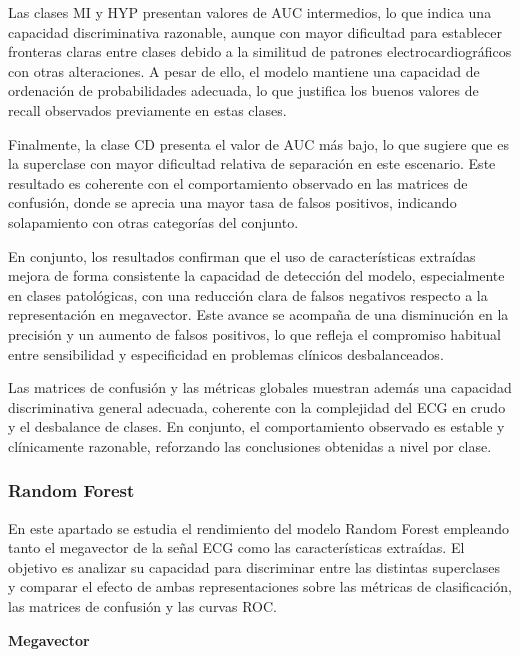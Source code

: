 \documentclass[12pt,a4paper,twoside]{book}
\begin{document}
Las clases MI y HYP presentan valores de AUC intermedios, lo que indica una capacidad discriminativa razonable, aunque con mayor dificultad para establecer fronteras claras entre clases debido a la similitud de patrones electrocardiográficos con otras alteraciones. 
A pesar de ello, el modelo mantiene una capacidad de ordenación de probabilidades adecuada, lo que justifica los buenos valores de recall observados previamente en estas clases.

Finalmente, la clase CD presenta el valor de AUC más bajo, lo que sugiere que es la superclase con mayor dificultad relativa de separación en este escenario. 
Este resultado es coherente con el comportamiento observado en las matrices de confusión, donde se aprecia una mayor tasa de falsos positivos, indicando solapamiento con otras categorías del conjunto.

\vspace{0.5cm}

En conjunto, los resultados confirman que el uso de características extraídas mejora de forma consistente la capacidad de detección del modelo, especialmente en clases patológicas, con una reducción clara de falsos negativos respecto a la representación en megavector. 
Este avance se acompaña de una disminución en la precisión y un aumento de falsos positivos, lo que refleja el compromiso habitual entre sensibilidad y especificidad en problemas clínicos desbalanceados.

Las matrices de confusión y las métricas globales muestran además una capacidad discriminativa general adecuada, coherente con la complejidad del ECG en crudo y el desbalance de clases. 
En conjunto, el comportamiento observado es estable y clínicamente razonable, reforzando las conclusiones obtenidas a nivel por clase.

\subsubsection*{Random Forest}

En este apartado se estudia el rendimiento del modelo Random Forest empleando tanto el megavector de la señal ECG como las características extraídas. 
El objetivo es analizar su capacidad para discriminar entre las distintas superclases y comparar el efecto de ambas representaciones sobre las métricas de clasificación, las matrices de confusión y las curvas ROC.

\vspace{0.5cm}

\textbf{Megavector}
\end{document}
